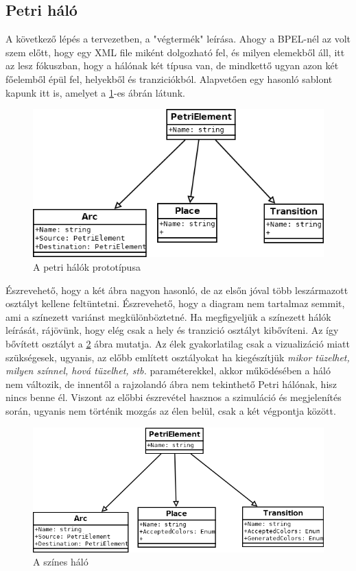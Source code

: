 \subsection{Petri háló}
A következő lépés a tervezetben, a "végtermék" leírása. Ahogy a BPEL-nél az volt szem előtt, hogy egy XML file miként dolgozható fel, és milyen elemekből áll, itt az lesz fókuszban, hogy a hálónak két típusa van, de mindkettő ugyan azon két főelemből épül fel, helyekből és tranziciókból. Alapvetően egy hasonló sablont kapunk itt is, amelyet a \ref{fig:petriclass}-es ábrán látunk.
\begin{figure}[h!]
\centering
\includegraphics[scale=0.5]{images/petriClass.png}
\caption{A petri hálók prototípusa}
\label{fig:petriclass}
\end{figure}

Észrevehető, hogy a két ábra nagyon hasonló, de az elsőn jóval több leszármazott osztályt kellene feltüntetni. Észrevehető, hogy a diagram nem tartalmaz semmit, ami a színezett variánst megkülönböztetné. Ha megfigyeljük a színezett hálók leírását, rájövünk, hogy elég csak a hely és tranzició osztályt kibővíteni. Az így bővített osztályt a \ref{fig:colornet} ábra mutatja. Az élek gyakorlatilag csak a vizualizáció miatt szükségesek, ugyanis, az előbb említett osztályokat ha kiegészítjük \emph{mikor tüzelhet, milyen színnel, hová tüzelhet, stb. } paraméterekkel, akkor működésében a háló nem változik, de innentől a rajzolandó ábra nem tekinthető Petri hálónak, hisz nincs benne él. Viszont az előbbi észrevétel hasznos a szimuláció és megjelenítés során, ugyanis nem történik mozgás az élen belül, csak a két végpontja között. 

\begin{figure}[h!]
\centering
\includegraphics[scale=0.5]{images/PentC.png}
\caption{A színes háló}
\label{fig:colornet}
\end{figure}

